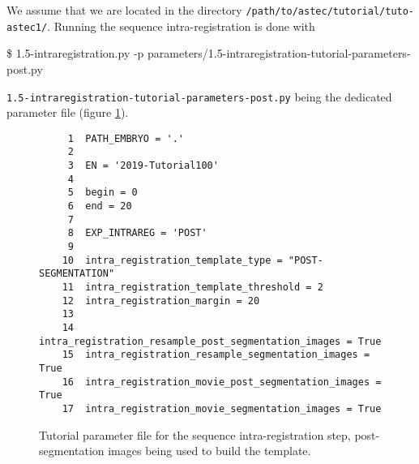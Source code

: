 We assume that we are located in the directory
\texttt{/path/to/astec/tutorial/tuto-astec1/}. Running the sequence intra-registration is
done with
\begin{code}{0.8}
  \$ 1.5-intraregistration.py -p parameters/1.5-intraregistration-tutorial-parameters-post.py 
\end{code}
\texttt{1.5-intraregistration-tutorial-parameters-post.py} being the
dedicated parameter file  (figure \ref{fig:tutorial:parameter:intra:registration:post}).

\begin{figure}
\begin{framed}
\begin{verbatim}
     1	PATH_EMBRYO = '.'
     2	
     3	EN = '2019-Tutorial100'
     4	
     5	begin = 0
     6	end = 20
     7	
     8	EXP_INTRAREG = 'POST'
     9	
    10	intra_registration_template_type = "POST-SEGMENTATION"
    11	intra_registration_template_threshold = 2
    12	intra_registration_margin = 20
    13	
    14	intra_registration_resample_post_segmentation_images = True
    15	intra_registration_resample_segmentation_images = True
    16	intra_registration_movie_post_segmentation_images = True
    17	intra_registration_movie_segmentation_images = True
\end{verbatim}
\end{framed}
\caption{\label{fig:tutorial:parameter:intra:registration:post} Tutorial
  parameter file for the sequence intra-registration step,
  post-segmentation images being used to build the template.}
\end{figure}

